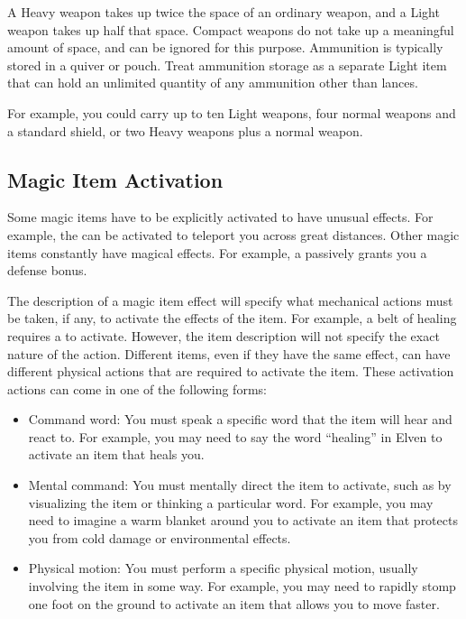     A Heavy weapon takes up twice the space of an ordinary weapon, and a Light weapon takes up half that space.
    Compact weapons do not take up a meaningful amount of space, and can be ignored for this purpose.
    Ammunition is typically stored in a quiver or pouch.
    Treat ammunition storage as a separate Light item that can hold an unlimited quantity of any ammunition other than lances.

    For example, you could carry up to ten Light weapons, four normal weapons and a standard shield, or two Heavy weapons plus a normal weapon.

  \subsection{Magic Item Activation}

    Some magic items have to be explicitly activated to have unusual effects.
    For example, the  can be activated to teleport you across great distances.
    Other magic items constantly have magical effects.
    For example, a  passively grants you a defense bonus.

    The description of a magic item effect will specify what mechanical actions must be taken, if any, to activate the effects of the item.
    For example, a belt of healing requires a  to activate.
    However, the item description will not specify the exact nature of the action.
    Different items, even if they have the same effect, can have different physical actions that are required to activate the item.
    These activation actions can come in one of the following forms:
    \begin{itemize}
      \item Command word: You must speak a specific word that the item will hear and react to.
        For example, you may need to say the word ``healing'' in Elven to activate an item that heals you.
      \item Mental command: You must mentally direct the item to activate, such as by visualizing the item or thinking a particular word.
        For example, you may need to imagine a warm blanket around you to activate an item that protects you from cold damage or environmental effects.
      \item Physical motion: You must perform a specific physical motion, usually involving the item in some way.
        For example, you may need to rapidly stomp one foot on the ground to activate an item that allows you to move faster.
    \end{itemize}

